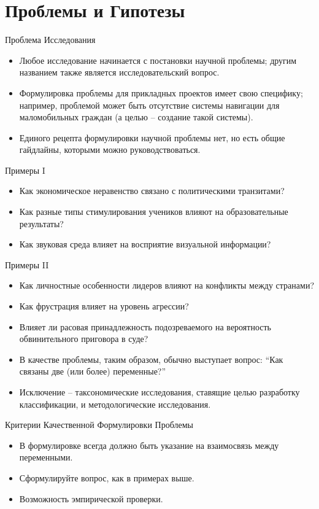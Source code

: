 \documentclass{beamer}
\begin{document}
\section{Проблемы и Гипотезы}
\begin{frame}{Проблема Исследования}
\begin{itemize}
	\setlength\itemsep{2em}
	\item Любое исследование начинается с постановки научной проблемы; другим названием также является исследовательский вопрос.
	\item Формулировка проблемы для прикладных проектов имеет свою специфику; например,  проблемой может быть отсутствие системы навигации для маломобильных граждан (а целью -- создание такой системы). 
	\item Единого рецепта формулировки научной проблемы нет,  но есть общие гайдлайны,  которыми можно руководствоваться. 
\end{itemize}
\end{frame}
\begin{frame}{Примеры I}
\begin{itemize}
	\setlength\itemsep{2em}
	\item Как экономическое неравенство связано с политическими транзитами? 
	\item Как разные типы стимулирования учеников влияют на образовательные результаты? 
	\item Как звуковая среда влияет на восприятие визуальной информации? 
\end{itemize}
\end{frame}
\begin{frame}{Примеры II}
\begin{itemize}
	\setlength\itemsep{1em}
	\item Как личностные особенности лидеров влияют на конфликты между странами? 
	\item Как фрустрация влияет на уровень агрессии? 
	\item Влияет ли расовая принадлежность подозреваемого на вероятность обвинительного приговора в суде? 
	\item В качестве проблемы,  таким образом,  обычно выступает вопрос:  ``Как связаны две (или более) переменные?''
	\item Исключение -- таксономические исследования,  ставящие целью разработку классификации,  и методологические исследования.
\end{itemize}
\end{frame}
\begin{frame}{Критерии Качественной Формулировки Проблемы}
\begin{itemize}
	\setlength\itemsep{2em}
	\item В формулировке всегда должно быть указание на взаимосвязь между переменными. 
	\item Сформулируйте вопрос,  как в примерах выше.
	\item Возможность эмпирической проверки. 
\end{itemize}
\end{frame}
\end{document}
